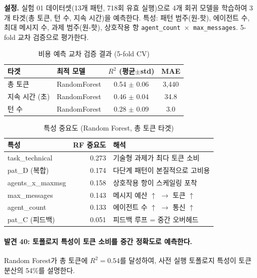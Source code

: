 \textbf{설정.} 실험 01 데이터셋(13개 패턴, 718회 유효 실행)으로 4개 회귀 모델을 학습하여 3개 타겟(총 토큰, 턴 수, 지속 시간)을 예측한다. 특성: 패턴 범주(원-핫), 에이전트 수, 최대 메시지 수, 과제 범주(원-핫), 상호작용 항 \texttt{agent\_count $\times$ max\_messages}. 5-fold 교차 검증으로 평가한다.

\begin{table}[H]
\centering
\caption{비용 예측 교차 검증 결과 (5-fold CV)}
\label{tab:cost-prediction-cv}
{\small
\begin{tabular}{llcc}
\toprule
타겟 & 최적 모델 & $R^{2}$ (평균$\pm$std) & MAE \\
\midrule
총 토큰     & RandomForest & 0.54 $\pm$ 0.06 & 3,440 \\
지속 시간 (초) & RandomForest & 0.46 $\pm$ 0.04 & 34.8 \\
턴 수       & RandomForest & 0.28 $\pm$ 0.09 & 3.0 \\
\bottomrule
\end{tabular}
}
\end{table}

\begin{table}[H]
\centering
\caption{특성 중요도 (Random Forest, 총 토큰 타겟)}
\label{tab:feature-importance}
{\small
\begin{tabular}{lrl}
\toprule
특성 & RF 중요도 & 해석 \\
\midrule
task\_technical     & 0.273 & 기술형 과제가 최다 토큰 소비 \\
pat\_D (복합)       & 0.174 & 다단계 패턴이 본질적으로 고비용 \\
agents\_x\_maxmsg   & 0.158 & 상호작용 항이 스케일링 포착 \\
max\_messages       & 0.143 & 메시지 예산 $\uparrow$ $\to$ 토큰 $\uparrow$ \\
agent\_count        & 0.133 & 에이전트 수 $\uparrow$ $\to$ 통신 $\uparrow$ \\
pat\_C (피드백)     & 0.051 & 피드백 루프 = 중간 오버헤드 \\
\bottomrule
\end{tabular}
}
\end{table}

\paragraph{발견 40: 토폴로지 특성이 토큰 소비를 중간 정확도로 예측한다.}
Random Forest가 총 토큰에 $R^{2}=0.54$를 달성하여, 사전 실행 토폴로지 특성이 토큰 분산의 54\%를 설명한다.


